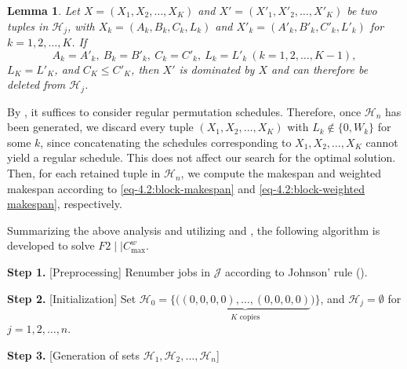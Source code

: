 \documentclass[12pt]{article} \textheight=24.5cm \textwidth=16.5cm \parskip = 0.165cm
\newtheorem{lemma}{Lemma}[section]
\begin{document}
\begin{sloppypar}
        \begin{lemma}\label{lem:dominance}
            Let $X=(X_1, X_2, \ldots, X_K)$ and $X'=(X'_1, X'_2, \ldots, X'_K)$ be two tuples
            in $\mathcal{H}_j$, with $X_k=(A_k, B_k, C_k, L_k)$ and $X'_k=(A'_k, B'_k, C'_k, L'_k)$ for $k=1, 2, \ldots, K$. If \begin{equation*}
                A_k = A'_k, ~ B_k = B'_k, ~ C_k=C'_k, ~ L_k = L'_k ~ (k=1, 2, \ldots, K-1),
            \end{equation*}
            $L_K = L'_K$, and $C_K \leq C'_K$, then $X'$ is dominated by $X$ and can therefore be deleted from $\mathcal{H}_j$.
        \end{lemma}
        
        By , it suffices to consider regular permutation schedules.
        Therefore, once $\mathcal{H}_n$ has been generated, we discard every tuple $(X_1, X_2, \ldots, X_K)$ with $L_k \notin \{0, W_k\}$ for some $k$, since concatenating the schedules corresponding to $X_1, X_2, \ldots, X_K$ cannot yield a regular schedule.
        This does not affect our search for the optimal solution.
        Then, for each retained tuple in $\mathcal{H}_n$, we compute the makespan and weighted makespan according to \cref{eq-4.2:block-makespan} and \cref{eq-4.2:block-weighted makespan}, respectively.
        
        Summarizing the above analysis and utilizing  and , the following algorithm is developed to solve $F2 \mid \mid C_{\max}^w$.
        
        \begin{algorithm}[H]
            \small
            \linespread{1.2}\selectfont
            \SetAlgoLined
            \DontPrintSemicolon
            \caption{An exact DP algorithm for $F2 \mid \mid C_{\max}^w$} \label{alg:dp}
            \BlankLine
            \textbf{Step 1.} [Preprocessing] Renumber jobs in $\mathcal{J}$ according to Johnson' rule (). \;
            
            \textbf{Step 2.} [Initialization] Set $\mathcal{H}_0=\{\Big(\underbrace{(0,0,0,0),\ldots,(0,0,0,0)}_{K\text{ copies}}\Big)\}$, and $\mathcal{H}_j=\emptyset$ for $j=1, 2, \ldots, n$. \;
            
            \textbf{Step 3.} [Generation of sets $\mathcal{H}_1, \mathcal{H}_2, \ldots, \mathcal{H}_n$]
            

\end{algorithm}
\end{sloppypar}
\end{document}
